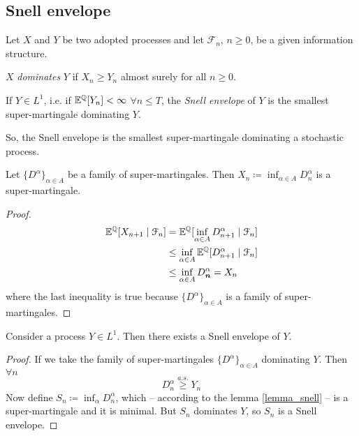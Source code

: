 \subsection{Snell envelope}
Let $X$ and $Y$ be two adopted processes and let $\mathcal{F}_n$, $n\ge0$, be a given information structure.
\begin{definition}[Domination]
    $X$ \emph{dominates} $Y$ if $X_n\ge Y_n$ almost surely for all $n\ge0$.
\end{definition}
\begin{definition}
    If $Y\in L^1$, i.e. if $\mathbb{E}^{\mathbb{Q}}[Y_n]<\infty$ $\forall n\le T$, the \emph{Snell envelope} of $Y$ is the smallest super-martingale dominating $Y$.
\end{definition}
\noindent So, the Snell envelope is the smallest super-martingale dominating a stochastic process. 
\begin{lemma}\label{lemma_snell}
    Let $\{D^{\alpha}\}_{\alpha\in A}$ be a family of super-martingales. Then $X_n\coloneqq\inf_{\alpha\in A}D_n^{\alpha}$ is a super-martingale.
\end{lemma}
\begin{proof}
    \begin{align*}
        \mathbb{E}^{\mathbb{Q}}[X_{n+1}\mid\mathcal{F}_{n}] 
        &= 
        \mathbb{E}^{\mathbb{Q}}[\inf_{\alpha\in A}D_{n+1}^{\alpha}\mid\mathcal{F}_{n}] \\
        &\le
        \inf_{\alpha\in A}\mathbb{E}^{\mathbb{Q}}[D_{n+1}^{\alpha}\mid\mathcal{F}_{n}] \\
        &\le
        \inf_{\alpha\in A}D_{\bm{n}}^{\alpha} = X_n
    \end{align*}
    where the last inequality is true because $\{D^{\alpha}\}_{\alpha\in A}$ is a family of super-martingales.
\end{proof}
\begin{proposition}
    Consider a process $Y\in L^1$. Then there exists a Snell envelope of $Y$.
\end{proposition}
\begin{proof}
    If we take the family of super-martingales $\{D^{\alpha}\}_{\alpha\in A}$ dominating $Y$. Then $\forall n$
    \begin{equation*}
        D^{\alpha}_n \overset{a.s.}{\ge} Y_n
    \end{equation*}
    Now define $S_n\coloneqq\inf_{\alpha}D_n^{\alpha}$, which -- according to the lemma \eqref{lemma_snell} -- is a super-martingale and it is minimal. But $S_n$ dominates $Y$, so $S_n$ is a Snell envelope.
\end{proof}
